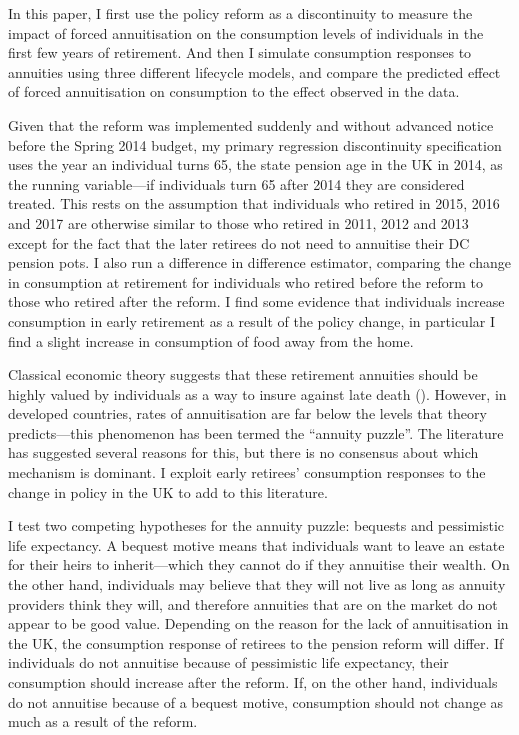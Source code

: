 \documentclass[12pt]{article}
\begin{document}
In this paper, I first use the policy reform as a discontinuity to measure the impact of forced annuitisation on the consumption levels of individuals in the first few years of retirement.
And then I simulate consumption responses to annuities using three different lifecycle models, and compare the predicted effect of forced annuitisation on consumption to the effect observed in the data.

Given that the reform was implemented suddenly and without advanced notice before the Spring 2014 budget, my primary regression discontinuity specification uses the year an individual turns 65, the state pension age in the UK in 2014, as the running variable---if individuals turn 65 after 2014 they are considered treated.
This rests on the assumption that individuals who retired in 2015, 2016 and 2017 are otherwise similar to those who retired in 2011, 2012 and 2013 except for the fact that the later retirees do not need to annuitise their DC pension pots.
I also run a difference in difference estimator, comparing the change in consumption at retirement for individuals who retired before the reform to those who retired after the reform.
I find some evidence that individuals increase consumption in early retirement as a result of the policy change, in particular I find a slight increase in consumption of food away from the home.

Classical economic theory suggests that these retirement annuities should be highly valued by individuals as a way to insure against late death (\cite{yaari-65}).
However, in developed countries, rates of annuitisation are far below the levels that theory predicts---this phenomenon has been termed the ``annuity puzzle''.
The literature has suggested several reasons for this, but there is no consensus about which mechanism is dominant.
I exploit early retirees' consumption responses to the change in policy in the UK to add to this literature.

I test two competing hypotheses for the annuity puzzle: bequests and pessimistic life expectancy.
A bequest motive means that individuals want to leave an estate for their heirs to inherit---which they cannot do if they annuitise their wealth.
On the other hand, individuals may believe that they will not live as long as annuity providers think they will, and therefore annuities that are on the market do not appear to be good value.
Depending on the reason for the lack of annuitisation in the UK, the consumption response of retirees to the pension reform will differ.
If individuals do not annuitise because of pessimistic life expectancy, their consumption should increase after the reform.
If, on the other hand, individuals do not annuitise because of a bequest motive, consumption should not change as much as a result of the reform.
\end{document}

